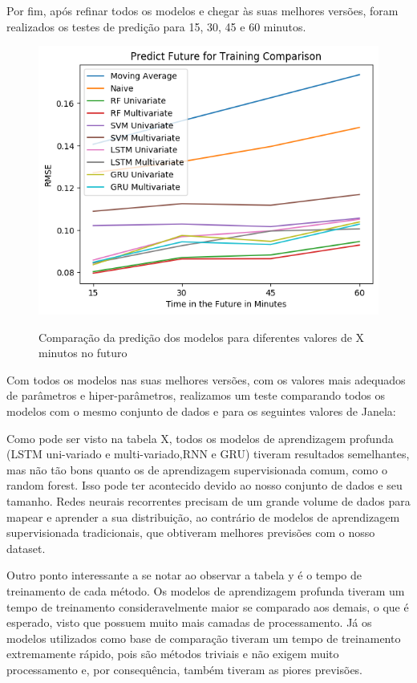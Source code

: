 Por fim, após refinar todos os modelos e chegar às suas melhores versões, foram realizados os testes de predição para 15, 30, 45 e 60 minutos.

\begin{figure}[H]
    \centering
    \includegraphics[scale=0.8]{monography/img/predict_future_for_training_comparison_rmse.png}
    \label{figure:rf}
    \caption{Comparação da predição dos modelos para diferentes valores de X minutos no futuro \textit{\acrshort{}}\footnotemark}
\end{figure}


Com todos os modelos nas suas melhores versões, com os valores mais adequados de parâmetros e hiper-parâmetros, realizamos um teste comparando todos os modelos com o mesmo conjunto de dados e para os seguintes valores de Janela: 


Como pode ser visto na tabela X,  todos  os  modelos  de aprendizagem  profunda  (LSTM  uni-variado  e  multi-variado,RNN  e  GRU)  tiveram  resultados  semelhantes,  mas  não  tão bons quanto os de aprendizagem supervisionada comum, como o random forest. Isso  pode  ter  acontecido  devido  ao  nosso  conjunto  de dados  e  seu  tamanho.  Redes  neurais  recorrentes  precisam de  um  grande  volume  de  dados  para  mapear  e  aprender  a sua  distribuição,  ao  contrário  de  modelos  de  aprendizagem supervisionada  tradicionais, que obtiveram melhores previsões com o nosso dataset.

Outro  ponto  interessante  a  se  notar ao observar a tabela y  é  o  tempo  de  treinamento de cada método. Os modelos de aprendizagem profunda tiveram um tempo de treinamento consideravelmente maior se comparado aos demais, o que é esperado, visto que possuem muito mais camadas de processamento. Já os  modelos  utilizados  como  base  de  comparação  tiveram um  tempo  de treinamento  extremamente  rápido,  pois  são métodos triviais  e  não  exigem  muito  processamento  e,  por consequência, também tiveram as piores previsões.


